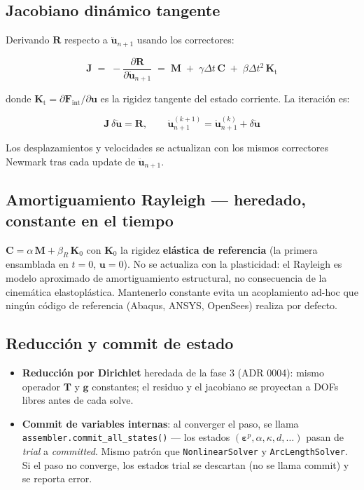 \documentclass[11pt,letterpaper,oneside]{report}
\begin{document}
\subsection{Jacobiano dinámico tangente}

Derivando $\mathbf R$ respecto a $\ddot{\mathbf u}_{n+1}$ usando los correctores:

\[
\mathbf J \;=\; -\frac{\partial \mathbf R}{\partial \ddot{\mathbf u}_{n+1}} \;=\; \mathbf M \;+\; \gamma\Delta t\,\mathbf C \;+\; \beta\Delta t^2\,\mathbf K_\text{t}
\]

donde $\mathbf K_\text{t} = \partial \mathbf F_\text{int}/\partial \mathbf u$ es la
rigidez tangente del estado corriente. La iteración es:

\[
\mathbf J\,\delta \ddot{\mathbf u} = \mathbf R, \qquad \ddot{\mathbf u}_{n+1}^{(k+1)} = \ddot{\mathbf u}_{n+1}^{(k)} + \delta \ddot{\mathbf u}
\]

Los desplazamientos y velocidades se actualizan con los mismos correctores
Newmark tras cada update de $\ddot{\mathbf u}_{n+1}$.

\subsection{Amortiguamiento Rayleigh --- heredado, constante en el tiempo}

$\mathbf C = \alpha\,\mathbf M + \beta_R\,\mathbf K_0$ con $\mathbf K_0$ la
rigidez \textbf{elástica de referencia} (la primera ensamblada en $t = 0$, $\mathbf u = 0$).
No se actualiza con la plasticidad: el Rayleigh es modelo aproximado de
amortiguamiento estructural, no consecuencia de la cinemática elastoplástica.
Mantenerlo constante evita un acoplamiento ad-hoc que ningún código de
referencia (Abaqus, ANSYS, OpenSees) realiza por defecto.

\subsection{Reducción y commit de estado}

\begin{itemize}
  \item \textbf{Reducción por Dirichlet} heredada de la fase 3 (ADR 0004): mismo operador $\mathbf T$ y $\mathbf g$ constantes; el residuo y el jacobiano se proyectan a DOFs libres antes de cada solve.
  \item \textbf{Commit de variables internas}: al converger el paso, se llama \texttt{assembler.commit\_all\_states()} --- los estados $(\boldsymbol\varepsilon^p, \alpha, \kappa, d, \ldots)$ pasan de \textit{trial} a \textit{committed}. Mismo patrón que \texttt{NonlinearSolver} y \texttt{ArcLengthSolver}. Si el paso no converge, los estados trial se descartan (no se llama commit) y se reporta error.
\end{itemize}
\end{document}
